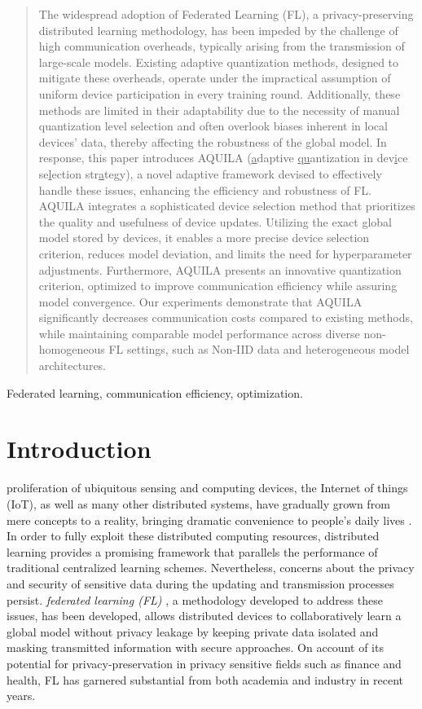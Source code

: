 \documentclass[lettersize,journal]{IEEEtran}
\begin{document}
\begin{abstract}
The widespread adoption of Federated Learning (FL), a privacy-preserving distributed learning methodology, has been impeded by the challenge of high communication overheads, typically arising from the transmission of large-scale models. Existing adaptive quantization methods, designed to mitigate these overheads, operate under the impractical assumption of uniform device participation in every training round. Additionally, these methods are limited in their adaptability due to the necessity of manual quantization level selection and often overlook biases inherent in local devices' data, thereby affecting the robustness of the global model. In response, this paper introduces AQUILA (\underline{a}daptive \underline{qu}antization in dev\underline{i}ce se\underline{l}ection str\underline{a}tegy), a novel adaptive framework devised to effectively handle these issues, enhancing the efficiency and robustness of FL. AQUILA integrates a sophisticated device selection method that prioritizes the quality and usefulness of device updates. Utilizing the exact global model stored by devices, it enables a more precise device selection criterion, reduces model deviation, and limits the need for hyperparameter adjustments. Furthermore, AQUILA presents an innovative quantization criterion, optimized to improve communication efficiency while assuring model convergence. Our experiments demonstrate that AQUILA significantly decreases communication costs compared to existing methods, while maintaining comparable model performance across diverse non-homogeneous FL settings, such as Non-IID data and heterogeneous model architectures.
\end{abstract}

\begin{IEEEkeywords}
Federated learning, communication efficiency, optimization.
\end{IEEEkeywords}


\section{Introduction}
 proliferation of ubiquitous sensing and computing devices, the Internet of things (IoT), as well as many other distributed systems, have gradually grown from mere concepts to a reality, bringing dramatic convenience to people's daily lives \cite{vehicularIoT, liu2020fedvision, Googlekeyboard}. In order to fully exploit these distributed computing resources, distributed learning provides a promising framework that parallels the performance of traditional centralized learning schemes. Nevertheless, concerns about the privacy and security of sensitive data during the updating and transmission processes persist. \emph{federated learning (FL)} \cite{mcmahan2017communication}, a methodology developed to address these issues, has been developed, allows distributed devices to collaboratively learn a global model without privacy leakage by keeping private data isolated and masking transmitted information with secure approaches. On account of its potential for privacy-preservation in privacy sensitive fields such as finance and health, FL has garnered substantial from both academia and industry in recent years.
\end{document}

